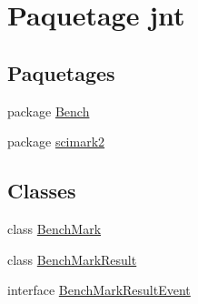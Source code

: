 \hypertarget{namespacejnt}{\section{Paquetage jnt}
\label{namespacejnt}
}
\subsection*{Paquetages}
\begin{DoxyCompactItemize}
\item 
package \hyperlink{namespacejnt_1_1Bench}{Bench}
\item 
package \hyperlink{namespacejnt_1_1scimark2}{scimark2}
\end{DoxyCompactItemize}
\subsection*{Classes}
\begin{DoxyCompactItemize}
\item 
class \hyperlink{classjnt_1_1BenchMark}{Bench\-Mark}
\item 
class \hyperlink{classjnt_1_1BenchMarkResult}{Bench\-Mark\-Result}
\item 
interface \hyperlink{interfacejnt_1_1BenchMarkResultEvent}{Bench\-Mark\-Result\-Event}
\end{DoxyCompactItemize}
